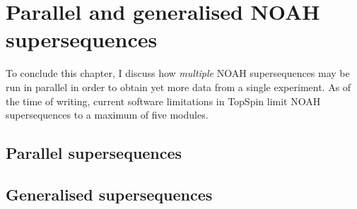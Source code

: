 \section{Parallel and generalised NOAH supersequences}
\label{sec:noah__parallel}

To conclude this chapter, I discuss how \textit{multiple} NOAH supersequences may be run in parallel in order to obtain yet more data from a single experiment.
As of the time of writing, current software limitations in TopSpin limit NOAH supersequences to a maximum of five modules.





\subsection{Parallel supersequences}




\subsection{Generalised supersequences}





